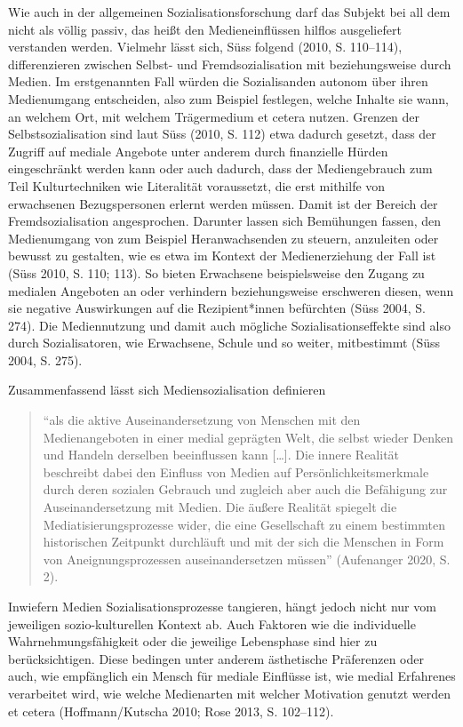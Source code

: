 \documentclass[a4paper,
fontsize=11pt,
oneside,
numbers=noperiodatend,
parskip=half-,
bibliography=totoc,
final
]{scrartcl}
\begin{document}
Wie auch in der allgemeinen Sozialisationsforschung darf das Subjekt bei
all dem nicht als völlig passiv, das heißt den Medieneinflüssen hilflos
ausgeliefert verstanden werden. Vielmehr lässt sich, Süss folgend (2010,
S. 110--114), differenzieren zwischen Selbst- und Fremdsozialisation mit
beziehungsweise durch Medien. Im erstgenannten Fall würden die
Sozialisanden autonom über ihren Medienumgang entscheiden, also zum
Beispiel festlegen, welche Inhalte sie wann, an welchem Ort, mit welchem
Trägermedium et cetera nutzen. Grenzen der Selbstsozialisation sind laut
Süss (2010, S. 112) etwa dadurch gesetzt, dass der Zugriff auf mediale
Angebote unter anderem durch finanzielle Hürden eingeschränkt werden
kann oder auch dadurch, dass der Mediengebrauch zum Teil Kulturtechniken
wie Literalität voraussetzt, die erst mithilfe von erwachsenen
Bezugspersonen erlernt werden müssen. Damit ist der Bereich der
Fremdsozialisation angesprochen. Darunter lassen sich Bemühungen fassen,
den Medienumgang von zum Beispiel Heranwachsenden zu steuern, anzuleiten
oder bewusst zu gestalten, wie es etwa im Kontext der Medienerziehung
der Fall ist (Süss 2010, S. 110; 113). So bieten Erwachsene
beispielsweise den Zugang zu medialen Angeboten an oder verhindern
beziehungsweise erschweren diesen, wenn sie negative Auswirkungen auf
die Rezipient*innen befürchten (Süss 2004, S. 274). Die Mediennutzung
und damit auch mögliche Sozialisationseffekte sind also durch
Sozialisatoren, wie Erwachsene, Schule und so weiter, mitbestimmt (Süss
2004, S. 275).

Zusammenfassend lässt sich Mediensozialisation definieren
\begin{quote} 
\enquote{als
die aktive Auseinandersetzung von Menschen mit den Medienangeboten in
einer medial geprägten Welt, die selbst wieder Denken und Handeln
derselben beeinflussen kann {[}\ldots{]}. Die innere Realität beschreibt
dabei den Einfluss von Medien auf Persönlichkeitsmerkmale durch deren
sozialen Gebrauch und zugleich aber auch die Befähigung zur
Auseinandersetzung mit Medien. Die äußere Realität spiegelt die
Mediatisierungsprozesse wider, die eine Gesellschaft zu einem bestimmten
historischen Zeitpunkt durchläuft und mit der sich die Menschen in Form
von Aneignungsprozessen auseinandersetzen müssen} (Aufenanger 2020, S.
2).
\end{quote}

Inwiefern Medien Sozialisationsprozesse tangieren, hängt jedoch nicht
nur vom jeweiligen sozio-kulturellen Kontext ab. Auch Faktoren wie die
individuelle Wahrnehmungsfähigkeit oder die jeweilige Lebensphase sind
hier zu berücksichtigen. Diese bedingen unter anderem ästhetische
Präferenzen oder auch, wie empfänglich ein Mensch für mediale Einflüsse
ist, wie medial Erfahrenes verarbeitet wird, wie welche Medienarten mit
welcher Motivation genutzt werden et cetera (Hoffmann/Kutscha 2010; Rose
2013, S. 102--112).
\end{document}
